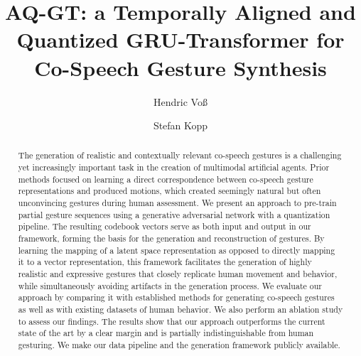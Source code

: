 \documentclass[sigconf]{acmart}
\begin{document}
\title{AQ-GT: a Temporally Aligned and Quantized GRU-Transformer for Co-Speech Gesture Synthesis}

\author{Hendric Voß}

\author{Stefan Kopp}


\renewcommand{\shortauthors}{Voss and Kopp}


\begin{abstract}
The generation of realistic and contextually relevant co-speech gestures is a challenging yet increasingly important task in the creation of multimodal artificial agents. Prior methods focused on learning a direct correspondence between co-speech gesture representations and produced motions, which created seemingly natural but often unconvincing gestures during human assessment. 
We present an approach to pre-train partial gesture sequences using a generative adversarial network with a quantization pipeline. The resulting codebook vectors serve as both input and output in our framework, forming the basis for the generation and reconstruction of gestures. By learning the mapping of a latent space representation as opposed to directly mapping it to a vector representation, this framework facilitates the generation of highly realistic and expressive gestures that closely replicate human movement and behavior, while simultaneously avoiding artifacts in the generation process. We evaluate our approach by comparing it with established methods for generating co-speech gestures as well as with existing datasets of human behavior. We also perform an ablation study to assess our findings. The results show that our approach outperforms the current state of the art by a clear margin and is partially indistinguishable from human gesturing. We make our data pipeline and the generation framework publicly available.
\end{abstract}
\end{document}
